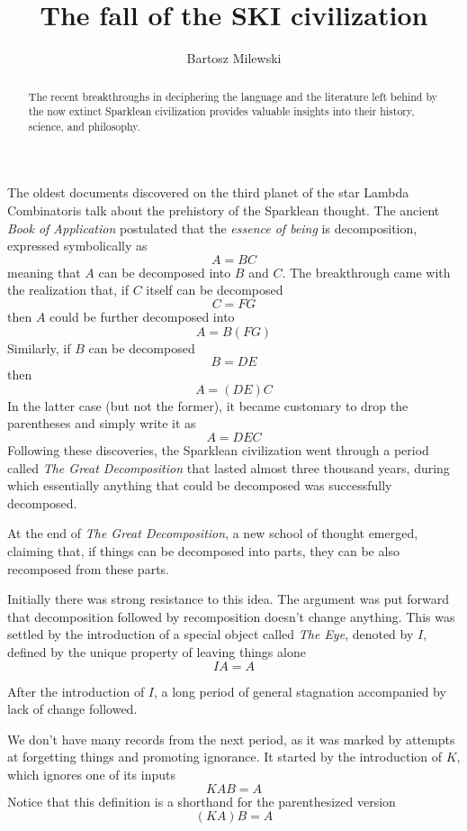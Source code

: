 \documentclass[11pt]{amsart}
\author{Bartosz Milewski}
\title{The fall of the SKI civilization}
\begin{document}
\maketitle{}

\begin{abstract}
The recent breakthroughs in deciphering the language and the literature left behind by the now extinct Sparklean civilization provides valuable insights into their history, science, and philosophy. 
\end{abstract}

The oldest documents discovered on the third planet of the star Lambda Combinatoris talk about the prehistory of the Sparklean thought. The ancient \emph{Book of Application} postulated that the \emph{essence of being} is decomposition, expressed symbolically as 
 \[ A = B C\]
meaning that $A$ can be decomposed into $B$ and $C$. The breakthrough came with the realization that, if $C$ itself can be decomposed
 \[ C = F G\]
then $A$ could be further decomposed into
 \[ A = B (F G)\]
Similarly, if $B$ can be decomposed
 \[ B = D E\]
then 
 \[ A = (D E) C\]
In the latter case (but not the former), it became customary to drop the parentheses and simply write it as
 \[ A = D E C\]
Following these discoveries, the Sparklean civilization went through a period called \emph{The Great Decomposition} that lasted almost three thousand years, during which essentially anything that could be decomposed was successfully decomposed.

At the end of \emph{The Great Decomposition}, a new school of thought emerged, claiming that, if things can be decomposed into parts, they can be also recomposed from these parts. 

Initially there was strong resistance to this idea. The argument was put forward that decomposition followed by recomposition doesn't change anything. This was settled by the introduction of a special object called \emph{The Eye}, denoted by $I,$ defined by the unique property of leaving things alone
 \[ I A = A\]

After the introduction of $I$, a long period of general stagnation accompanied by lack of change followed.

We don't have many records from the next period, as it was marked by attempts at forgetting things and promoting ignorance. It started by the introduction of $K$, which ignores one of its inputs
 \[ K A B = A\]
Notice that this definition is a shorthand for the parenthesized version
 \[ (K A) B = A\]
\end{document}
